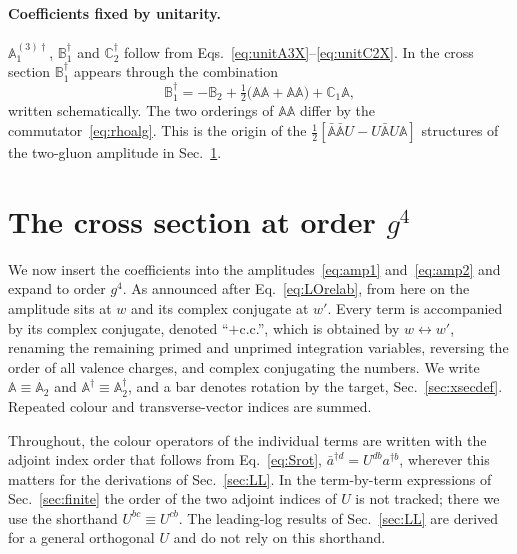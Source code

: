 \documentclass[aps,prd,onecolumn,superscriptaddress,nofootinbib,floatfix,longbibliography,11pt]{revtex4-2}
\numberwithin{equation}{section}
\def\mf#1{\mathbb{#1}}
\begin{document}
\paragraph*{Coefficients fixed by unitarity.} $\mf A^{(3)\dagger}_1$, $\mf B_1^\dagger$ and $\mf C_2^\dagger$ follow from Eqs.~\eqref{eq:unitA3X}--\eqref{eq:unitC2X}. In the cross section $\mf B_1^\dagger$ appears through the combination
\begin{equation}
\mf B^\dagger_1=-\mf B_2+\tfrac12\big(\mf A\mf A+\mf A\mf A\big)+\mf C_1\mf A,
\end{equation}
written schematically. The two orderings of $\mf A\mf A$ differ by the commutator~\eqref{eq:rhoalg}. This is the origin of the $\frac12[\bar{\mf A}\bar{\mf A}U-U\bar{\mf A}U\mf A]$ structures of the two-gluon amplitude in Sec.~\ref{sec:xsec}.
\section{The cross section at order \texorpdfstring{$g^4$}{g4}}\label{sec:xsec}

We now insert the coefficients into the amplitudes~\eqref{eq:amp1} and~\eqref{eq:amp2} and expand to order $g^4$. As announced after Eq.~\eqref{eq:LOrelab}, from here on the amplitude sits at $w$ and its complex conjugate at $w'$. Every term is accompanied by its complex conjugate, denoted ``$+$c.c.'', which is obtained by $w\leftrightarrow w'$, renaming the remaining primed and unprimed integration variables, reversing the order of all valence charges, and complex conjugating the numbers. We write $\mf A\equiv\mf A_2$ and $\mf A^\dagger\equiv\mf A^\dagger_2$, and a bar denotes rotation by the target, Sec.~\ref{sec:xsecdef}. Repeated colour and transverse-vector indices are summed.

Throughout, the colour operators of the individual terms are written with the adjoint index order that follows from Eq.~\eqref{eq:Srot}, $\bar a^{\dagger d}=U^{db}a^{\dagger b}$, wherever this matters for the derivations of Sec.~\ref{sec:LL}. In the term-by-term expressions of Sec.~\ref{sec:finite} the order of the two adjoint indices of $U$ is not tracked; there we use the shorthand $U^{bc}\equiv U^{cb}$. The leading-log results of Sec.~\ref{sec:LL} are derived for a general orthogonal $U$ and do not rely on this shorthand.
\end{document}
